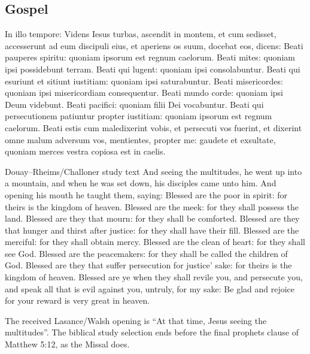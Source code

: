 \subsection{Gospel}
\label{proper-gospel}
\begin{latinproper}
In illo tempore: Videns Iesus turbas, ascendit in montem, et cum sedisset, accesserunt ad eum discipuli eius, et aperiens os suum, docebat eos, dicens: Beati pauperes spiritu: quoniam ipsorum est regnum caelorum. Beati mites: quoniam ipsi possidebunt terram. Beati qui lugent: quoniam ipsi consolabuntur. Beati qui esuriunt et sitiunt iustitiam: quoniam ipsi saturabuntur. Beati misericordes: quoniam ipsi misericordiam consequentur. Beati mundo corde: quoniam ipsi Deum videbunt. Beati pacifici: quoniam filii Dei vocabuntur. Beati qui persecutionem patiuntur propter iustitiam: quoniam ipsorum est regnum caelorum. Beati estis cum maledixerint vobis, et persecuti vos fuerint, et dixerint omne malum adversum vos, mentientes, propter me: gaudete et exsultate, quoniam merces vestra copiosa est in caelis.
\end{latinproper}
\begin{englishwitness}{Douay--Rheims/Challoner study text}
And seeing the multitudes, he went up into a mountain, and when he was set down, his disciples came unto him. And opening his mouth he taught them, saying: Blessed are the poor in spirit: for theirs is the kingdom of heaven. Blessed are the meek: for they shall possess the land. Blessed are they that mourn: for they shall be comforted. Blessed are they that hunger and thirst after justice: for they shall have their fill. Blessed are the merciful: for they shall obtain mercy. Blessed are the clean of heart: for they shall see God. Blessed are the peacemakers: for they shall be called the children of God. Blessed are they that suffer persecution for justice’ sake: for theirs is the kingdom of heaven. Blessed are ye when they shall revile you, and persecute you, and speak all that is evil against you, untruly, for my sake: Be glad and rejoice for your reward is very great in heaven.
\end{englishwitness}
The received Lasance/Walsh opening is ``At that time, Jesus
seeing the multitudes”. The biblical study selection ends
before the final prophets clause of Matthew 5:12, as the Missal does.


